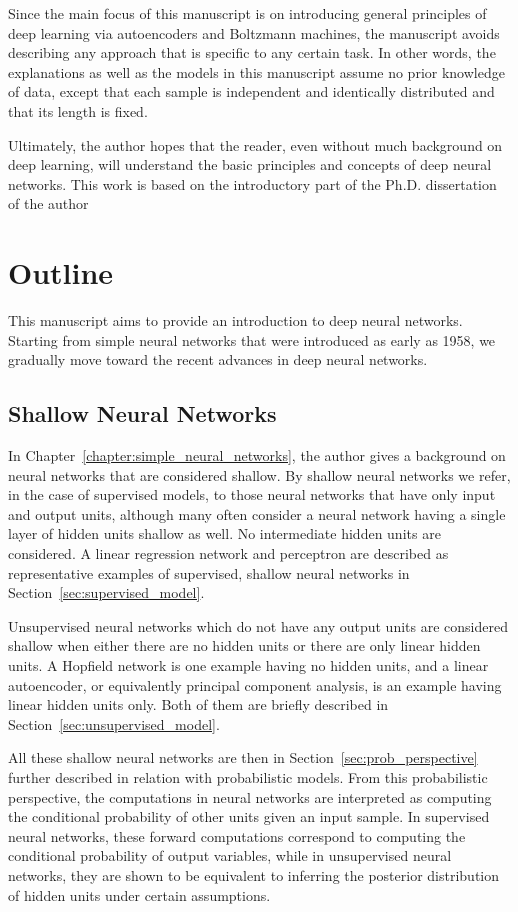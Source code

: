 \documentclass{now}
\begin{document}
Since the main focus of this manuscript is on introducing general principles of
deep learning via autoencoders and Boltzmann machines, the manuscript avoids
describing any approach that is specific to any certain task.  In other words,
the explanations as well as the models in this manuscript assume no prior
knowledge of data, except that each sample is independent and identically
distributed and that its length is fixed. 

Ultimately, the author hopes that the reader, even without much background on
deep learning, will understand the basic principles and concepts of deep neural
networks. This work is based on the introductory part of the Ph.D.  dissertation
of the author~\citep{Cho2014t}

\section{Outline}

This manuscript aims to provide an introduction to deep neural networks.
Starting from simple neural networks that were introduced as early as 1958, we
gradually move toward the recent advances in deep neural networks. 

\subsection{Shallow Neural Networks}

In Chapter~\ref{chapter:simple_neural_networks}, the author gives a background
on neural networks that are considered shallow. By shallow neural networks we
refer, in the case of supervised models, to those neural networks that have
only input and output units, although many often consider a neural network
having a single layer of hidden units shallow as well. No intermediate hidden
units are considered. A linear regression network and perceptron are described
as representative examples of supervised, shallow neural networks in
Section~\ref{sec:supervised_model}.

Unsupervised neural networks which do not have any output units are considered
shallow when either there are no hidden units or there are only linear hidden
units. A Hopfield network is one example having no hidden units, and a linear
autoencoder, or equivalently principal component analysis, is an example having
linear hidden units only. Both of them are briefly described in
Section~\ref{sec:unsupervised_model}.

All these shallow neural networks are then in
Section~\ref{sec:prob_perspective} further described in relation with
probabilistic models. From this probabilistic perspective, the computations in
neural networks are interpreted as computing the conditional probability of
other units given an input sample. In supervised neural networks, these forward
computations correspond to computing the conditional probability of output
variables, while in unsupervised neural networks, they are shown to be
equivalent to inferring the posterior distribution of hidden units under
certain assumptions.
\end{document}
